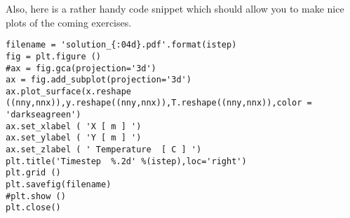 Also, here is a rather handy code snippet which should allow you to make nice plots of the coming exercises.

\begin{verbatim}
filename = 'solution_{:04d}.pdf'.format(istep) 
fig = plt.figure ()
#ax = fig.gca(projection='3d')
ax = fig.add_subplot(projection='3d')
ax.plot_surface(x.reshape ((nny,nnx)),y.reshape((nny,nnx)),T.reshape((nny,nnx)),color = 'darkseagreen')
ax.set_xlabel ( 'X [ m ] ')
ax.set_ylabel ( 'Y [ m ] ')
ax.set_zlabel ( ' Temperature  [ C ] ')
plt.title('Timestep  %.2d' %(istep),loc='right')
plt.grid ()
plt.savefig(filename)
#plt.show ()
plt.close()
\end{verbatim}

